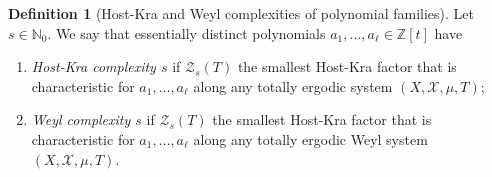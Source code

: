 \documentclass[11pt]{amsart}
\theoremstyle{definition}
\newtheorem{definition}[lemma]{Definition}
\DeclareMathOperator*{\E}{\mathbb{E}}
\newcommand{\N}{{\mathbb N}}
\newcommand{\Z}{{\mathbb Z}}
\newcommand{\CX}{{\mathcal X}}
\newcommand{\CZ}{{\mathcal Z}}
\newcommand{\norm}[1]{\left\Vert #1\right\Vert}
\newcommand{\nnorm}[1]{\lvert\!|\!| #1|\!|\!\rvert}
\newcommand{\1}{{\mathbf{1}}}
\begin{document}
\begin{definition}[Host-Kra and Weyl complexities of polynomial families]\label{D: complexity}
    Let $s\in\N_0$. We say that essentially distinct polynomials $a_1, \ldots, a_\ell\in\Z[t]$ have
    \begin{enumerate}
        \item \emph{Host-Kra complexity $s$} if $\CZ_s(T)$ the smallest Host-Kra factor that is characteristic for $a_1, \ldots, a_\ell$ along any totally ergodic system $(X, \CX, \mu, T)$;
        \item \emph{Weyl complexity $s$} if $\CZ_s(T)$ the smallest Host-Kra factor that is characteristic for $a_1, \ldots, a_\ell$ along any totally ergodic Weyl system $(X, \CX, \mu, T)$.
    \end{enumerate}
\end{definition}
\end{document}
